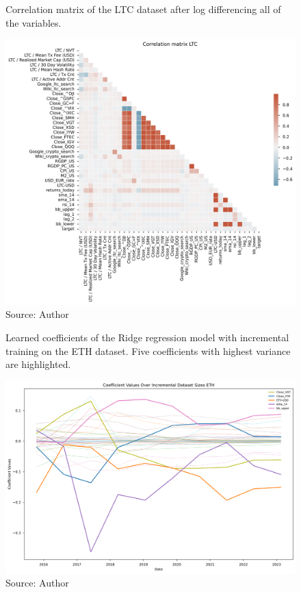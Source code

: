 \begin{figure}[!h]
    \centering
    \caption{Correlation matrix of the LTC dataset after
    log differencing all of the variables.}
    \includegraphics[width=1\textwidth]{Figures/Corr_ltc_logdiff.png}
    \caption*{Source: Author}
    \label{fig:Corr_ltc_logdiff}
\end{figure}


\begin{figure}[!h]
    \centering
    \caption{Learned coefficients of the Ridge regression model
    with incremental training on the ETH dataset. Five 
    coefficients with highest variance are highlighted.}
    \includegraphics[width=1\textwidth]{Figures/coefficient_values_incremental_eth.png}
    \caption*{Source: Author}
    \label{fig:coefs_incremental_eth}
\end{figure}

